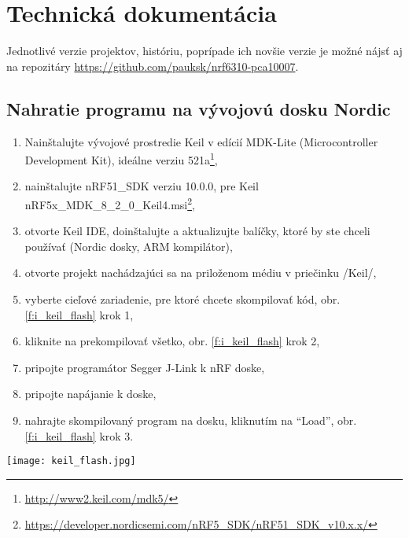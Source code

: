 \documentclass[12pt,a4paper,oneside,openright]{report}
\newcommand{\quotes}[1]{``#1''}
\begin{document}


\chapter{Technická dokumentácia} \label{s_manual}
Jednotlivé verzie projektov, históriu, poprípade ich novšie verzie je možné nájsť aj na repozitáry \url{https://github.com/pauksk/nrf6310-pca10007}.

	\section{Nahratie programu na vývojovú dosku Nordic} \label{s_nrf_program}
 \begin{enumerate}
 	\item Nainštalujte vývojové prostredie Keil v edícií MDK-Lite (Microcontroller Development Kit), ideálne verziu 521a\footnote{\url{http://www2.keil.com/mdk5/}},
 	\item nainštalujte nRF51\_SDK verziu 10.0.0, pre Keil nRF5x\_MDK\_8\_2\_0\_Keil4.msi\footnote{\url{https://developer.nordicsemi.com/nRF5_SDK/nRF51_SDK_v10.x.x/}},
 	\item otvorte Keil IDE, doinštalujte a aktualizujte balíčky, ktoré by ste chceli používať (Nordic dosky, ARM kompilátor),
 	\item otvorte projekt nachádzajúci sa na priloženom médiu v priečinku /Keil/,
 	\item vyberte cieľové zariadenie, pre ktoré chcete skompilovať kód, obr. \ref{f:i_keil_flash} krok 1,
 	\item kliknite na prekompilovať všetko, obr. \ref{f:i_keil_flash} krok 2,
 	\item pripojte programátor Segger J-Link k nRF doske,
 	\item pripojte napájanie k doske,
 	\item nahrajte skompilovaný program na dosku, kliknutím na \quotes{Load}, obr. \ref{f:i_keil_flash} krok 3.
 \end{enumerate}
 
 \begin{figure*}[!htb]
 	\centering
 	\texttt{[image: keil\_flash.jpg]}
 	\caption{Nahratie programu na vývojovú dosku.}
 	\label{f:i_keil_flash}
 \end{figure*}
 
 \newpage
 
\end{document}
